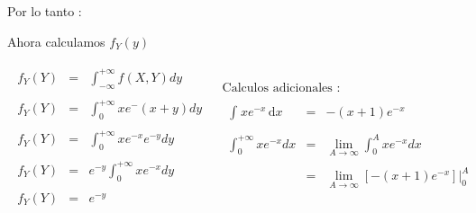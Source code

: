 \documentclass[12pt]{article}
\begin{document}
    \begin{flushleft}
        Por lo tanto :  
    \end{flushleft}
   

    \vspace{0.5cm }

    \begin{flushleft}
        Ahora calculamos $f_{Y}(y)$
    \end{flushleft}
   
    \begin{center}
        \begin{equation*}
            \begin{array}{c|c}
                \begin{array}{rcl}
                    f_{Y}(Y) & = & \displaystyle\int_{-\infty}^{+\infty}f{\left(X,Y\right)} dy 
                    \\
                    \\
                    f_{Y}(Y) & = & \displaystyle\int_{0}^{+\infty}xe^-\left(x+y\right)dy
                    \\
                    \\
                    f_{Y}(Y) & = & \displaystyle\int_{0}^{+\infty}xe^{-x}e^{-y}dy
                    \\
                    \\
                    f_{Y}(Y) & = & \displaystyle e^{-y }\int_{0}^{+\infty}xe^{-x}dy
                    \\
                    \\
                    f_{Y}(Y) & = & e^{-y}
                \end{array}
                &
                \begin{array}{l}
                    \mbox{Calculos adicionales :}
                    \\
                    \begin{array}{rcl}
                        \\
                        \int_{}^{} xe^{-x} \,\mathrm{d}x  & = & -\left(x+1\right)e^{-x}
                        \\
                        \\
                        \int_{0}^{+\infty}xe^{-x}dx & = & \displaystyle\lim_{A\to\infty}\int_{0}^{A}xe^{-x}dx
                        \\
                        \\
                        & = & \displaystyle\lim_{A\to\infty}\left[-\left(x+1\right)e^{-x}\right]\vert_{0}^{A}

\end{array}
\end{array}
\end{array}
\end{equation*}
\end{center}
\end{document}
